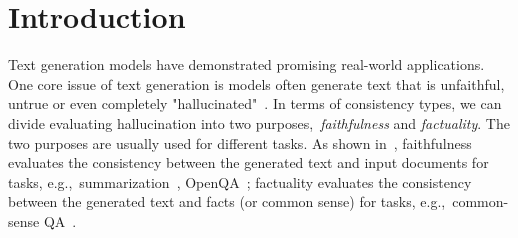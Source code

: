 \section{Introduction}
Text generation models have demonstrated promising real-world applications. One core issue of text generation is models often generate text that is unfaithful, untrue or even completely "hallucinated"~\cite{Rohrbach2018ObjectHI, maynez-etal-2020-faithfulness, Honovich2022TRUERF}. In terms of consistency types, we can divide evaluating hallucination into two purposes,~\emph{faithfulness} and \emph{factuality}. The two purposes are usually used for different tasks. As shown in~, faithfulness evaluates the consistency between the generated text and input documents for tasks, e.g.,~summarization~\cite{Nallapati2016AbstractiveTS}, OpenQA~\cite{Hermann2015TeachingMT}; factuality evaluates the consistency between the generated text and facts (or common sense) for tasks, e.g.,~common-sense QA~\cite{Zellers2018SWAGAL}. 
